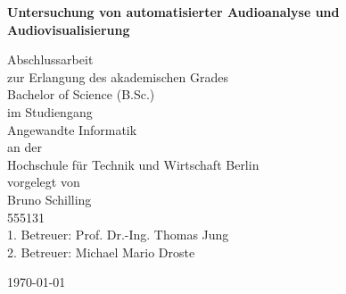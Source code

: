 \documentclass[11pt,a4paper]{article}
\begin{document}
\begin{titlepage}
\centering

\vspace*{10pt}
\scshape
{\huge \textbf{Untersuchung von automatisierter Audioanalyse und Audiovisualisierung} \par}

\vspace{70pt}
\large
Abschlussarbeit\\

\vspace{10pt}
\Large
zur Erlangung des akademischen Grades\\
Bachelor of Science (B.Sc.)\\

\vspace{30pt}
\large
im Studiengang\\

\Large
Angewandte Informatik\\

\vspace{30pt}
\large
an der\\

\Large
Hochschule für Technik und Wirtschaft Berlin\\

\vspace{30pt}
\large
vorgelegt von\\

\Large
Bruno Schilling\\

\large
555131\\

\vspace{30pt}
\Large
1. Betreuer: Prof. Dr.-Ing. Thomas Jung\\
2. Betreuer: Michael Mario Droste\\

\vfill
{\large \today\par}
\end{titlepage}

\newpage

\tableofcontents
\newpage

\end{document}
